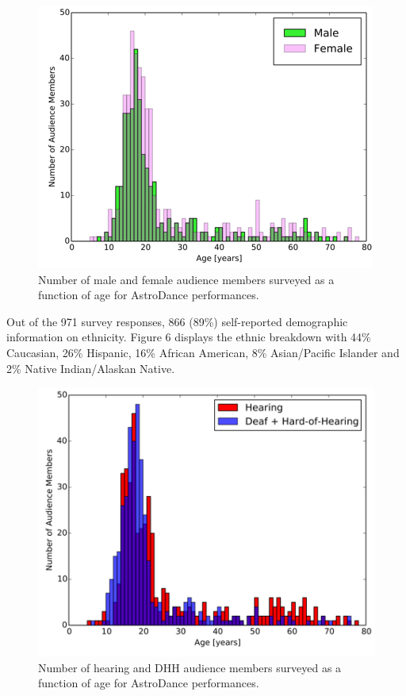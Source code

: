 \documentclass[11.5pt]{sig-alternate} %
\begin{document}
\begin{large}
\begin{figure}[!h]
    \centering
    \includegraphics[width=1\linewidth]{Fig_4.png}
    \caption{Number of male and female audience members surveyed as a function of age for AstroDance performances.}
\end{figure}

Out of the 971 survey responses, 866 (89\%) self-reported demographic information on ethnicity.  Figure 6 displays the ethnic breakdown with 44\% Caucasian, 26\% Hispanic, 16\% African American, 8\% Asian/Pacific Islander and 2\% Native Indian/Alaskan Native.

\begin{figure}[!h]
     \centering
     \includegraphics[width=1\linewidth]{Fig_5.png}
     \caption{Number of hearing and DHH audience members surveyed as a function of age for AstroDance performances.}
 \end{figure} 


\end{large}
\end{document}
